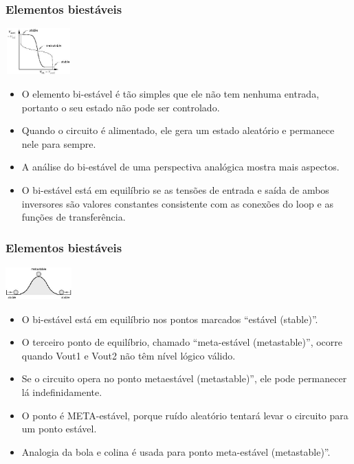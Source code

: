\documentclass{beamer}
\begin{document}
\begin{frame}
  \frametitle{Elementos biestáveis}
 \begin{center}
  \includegraphics[height = 0.7in, width = 1in]{slide14_filomeno} 
 \end{center}
 \begin{itemize}
  \item O elemento bi-estável é tão simples que ele não tem nenhuma entrada, portanto o seu estado não pode ser controlado.\pause
  \item Quando o circuito é alimentado, ele gera um estado aleatório e permanece nele para sempre.\pause
  \item A análise do bi-estável de uma perspectiva analógica mostra mais aspectos.\pause
  \item O bi-estável está em equilíbrio se as tensões de entrada e saída de ambos inversores são valores constantes consistente com as conexões do loop e as 
	funções de transferência.
 \end{itemize}
\end{frame}

\begin{frame}
  \frametitle{Elementos biestáveis}
 \begin{center}
  \includegraphics[height = 0.5in, width = 1in]{slide15_filomeno} 
 \end{center}
 \begin{itemize}
  \item O bi-estável está em equilíbrio nos pontos marcados “estável (stable)”.\pause
  \item O terceiro ponto de equilíbrio, chamado “meta-estável (metastable)”, ocorre quando Vout1 e Vout2 não têm nível lógico válido.\pause
  \item Se o circuito opera no ponto metaestável (metastable)”, ele pode permanecer lá  indefinidamente.\pause
  \item O ponto é META-estável, porque ruído aleatório tentará levar o circuito para um ponto estável.\pause
  \item Analogia da bola e colina é usada para ponto meta-estável (metastable)”.
 \end{itemize}
\end{frame}
\end{document}
